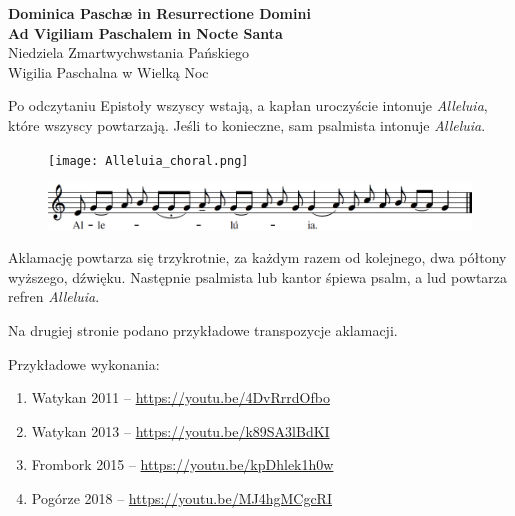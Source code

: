 \documentclass[11pt,oneside,notitlepage,a4paper,wide]{mwart}
\begin{document}

	{\centering\LARGE{\textbf{Dominica Paschæ in Resurrectione Domini\\Ad Vigiliam Paschalem in Nocte Santa}}\\\smallskip\large{Niedziela Zmartwychwstania Pańskiego\\Wigilia Paschalna w Wielką Noc}\par\vspace{5 mm}}

Po odczytaniu Epistoły wszyscy wstają, a kapłan uroczyście intonuje \emph{Alleluia}, które wszyscy powtarzają. Jeśli to konieczne, sam psalmista intonuje \emph{Alleluia}.

	\begin{figure}[h] \centering 
		\texttt{[image: Alleluia\_choral.png]}
		
		\medskip
		\includegraphics[width=\textwidth]{Alleluia_nuty.png}
	\end{figure}

Aklamację powtarza się trzykrotnie, za każdym razem od kolejnego, dwa półtony wyższego, dźwięku. Następnie psalmista lub kantor śpiewa psalm, a lud powtarza refren \emph{Alleluia}.

Na drugiej stronie podano przykładowe transpozycje aklamacji.\bigskip

Przykładowe wykonania:
	\begin{enumerate}[label=\alph*),leftmargin=1.25 cm]
		\item Watykan 2011 -- \href{https://youtu.be/4DvRrrdOfbo}{https://youtu.be/4DvRrrdOfbo}
		\item Watykan 2013 -- \href{https://youtu.be/k89SA3lBdKI}{https://youtu.be/k89SA3lBdKI}
		\item Frombork 2015 -- \href{https://youtu.be/kpDhlek1h0w}{https://youtu.be/kpDhlek1h0w}
		\item Pogórze 2018 -- \href{https://youtu.be/MJ4hgMCgcRI}{https://youtu.be/MJ4hgMCgcRI}	
	\end{enumerate}
\newpage 
\end{document}
